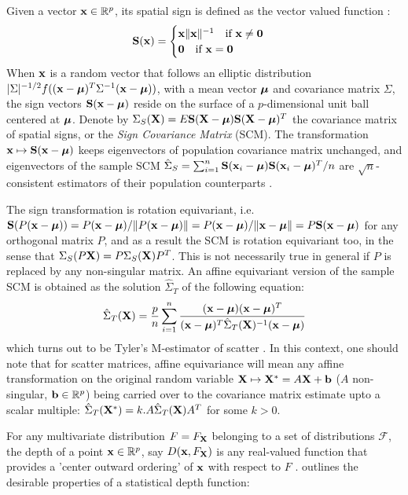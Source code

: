 \documentclass[fleqn,11pt]{article}
\begin{document}
Given a vector ${\bf{x}} \in \mathbb{R}^p$, its spatial sign is defined as the vector valued function \citep{MottonenOja95}:
%
$$ {\mathbf{S}}({\bf{x}}) = \begin{cases} {\bf{x}}\| {\bf{x}} \|^{-1} \quad \mbox{if }{\bf{x}} \neq \bf0\\
\bf0 \quad \mbox{if }{\bf{x}} = \bf0 \end{cases} $$
%
When ${\bf{x}}$ is a random vector that follows an elliptic distribution $|\Sigma|^{-1/2} f(({\bf{x}} - {\boldsymbol{\mu}})^T \Sigma^{-1} ({\bf{x}} - {\boldsymbol{\mu}}))$, with a mean vector ${\boldsymbol{\mu}}$ and covariance matrix $\Sigma$, the sign vectors ${\mathbf{S}}({\bf{x}} - {\boldsymbol{\mu}})$ reside on the surface of a $p$-dimensional unit ball centered at ${\boldsymbol{\mu}}$. Denote by $\Sigma_S({\mathbf{X}}) = E{\mathbf{S}} ({\mathbf{X}} - {\boldsymbol{\mu}}){\mathbf{S}} ({\mathbf{X}} - {\boldsymbol{\mu}})^T$ the covariance matrix of spatial signs, or the \textit{Sign Covariance Matrix} (SCM). The transformation ${\bf{x}} \mapsto {\mathbf{S}}({\bf{x}} - {\boldsymbol{\mu}})$ keeps eigenvectors of population covariance matrix unchanged, and eigenvectors of the sample SCM $ \hat \Sigma_S = \sum_{i=1}^n {\mathbf{S}} ({\bf{x}}_i - {\boldsymbol{\mu}}){\mathbf{S}} ({\bf{x}}_i - {\boldsymbol{\mu}})^T/n $ are $\sqrt n$-consistent estimators of their population counterparts \citep{taskinen12}.

The sign transformation is rotation equivariant, i.e. $ {\mathbf{S}}(P ({\bf{x}} - {\boldsymbol{\mu}})) = P({\bf{x}} - {\boldsymbol{\mu}})/\| P ({\bf{x}} - {\boldsymbol{\mu}})\| = P({\bf{x}} - {\boldsymbol{\mu}})/\|{\bf{x}} - {\boldsymbol{\mu}}\| = P {\mathbf{S}}({\bf{x}} - {\boldsymbol{\mu}})$ for any orthogonal matrix $P$, and as a result the SCM is rotation equivariant too, in the sense that $\Sigma_S(P{\mathbf{X}}) = P \Sigma_S({\mathbf{X}}) P^T$. This is not necessarily true in general if $P$ is replaced by any non-singular matrix. An affine equivariant version of the sample SCM is obtained as the solution $\hat \Sigma_T$ of the following equation:
%
$$ \hat \Sigma_T({\mathbf{X}}) = \frac{p}{n} \sum_{i=1}^n \frac{({\bf{x}} - {\boldsymbol{\mu}})({\bf{x}} - {\boldsymbol{\mu}})^T}{({\bf{x}} - {\boldsymbol{\mu}})^T \hat\Sigma_T({\mathbf{X}})^{-1} ({\bf{x}} - {\boldsymbol{\mu}})} $$
%
which turns out to be Tyler's M-estimator of scatter \citep{tyler87}. In this context, one should note that for scatter matrices, affine equivariance will mean any affine transformation on the original random variable ${\mathbf{X}} \mapsto {\mathbf{X}}^* = A{\mathbf{X}} + {\bf{b}}$ ($A$ non-singular, ${\bf{b}} \in \mathbb{R}^p$) being carried over to the covariance matrix estimate upto a scalar multiple: $\hat\Sigma_T({\mathbf{X}}^*) = k. A \hat\Sigma_T({\mathbf{X}}) A^T$ for some $k>0$.

For any multivariate distribution $F = F_{\mathbf{X}}$ belonging to a set of distributions $\mathcal F$, the depth of a point ${\bf{x}} \in \mathbb{R}^p$, say $D({\bf{x}}, F_{\mathbf{X}})$ is any real-valued function that provides a 'center outward ordering' of ${\bf{x}}$ with respect to $F$ \citep{zuo00}. \cite{liu90} outlines the desirable properties of a statistical depth function:
\end{document}
